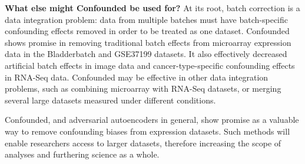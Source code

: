\documentclass[11pt]{article}
\begin{document}
\textbf{What else might Confounded be used for?}
At its root, batch correction is a data integration problem:
data from multiple batches must have batch-specific confounding effects removed in order to be treated as one dataset.
Confounded shows promise in removing traditional batch effects from microarray expression data in the Bladderbatch and GSE37199 datasets.
It also effectively decreased artificial batch effects in image data and cancer-type-specific confounding effects in RNA-Seq data.
Confounded may be effective in other data integration problems, such as combining microarray with RNA-Seq datasets, or merging several large datasets measured under different conditions.

Confounded, and adversarial autoencoders in general, show promise as a valuable way to remove confounding biases from expression datasets.
Such methods will enable researchers access to larger datasets, therefore increasing the scope of analyses and furthering science as a whole.

\newpage
{}
{}

\end{document}
